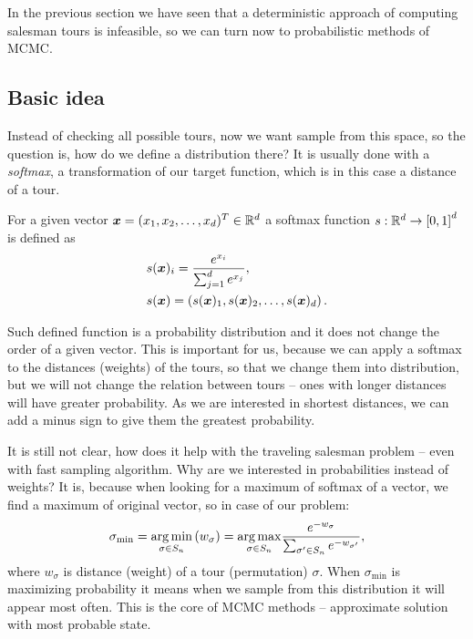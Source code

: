 In the previous section we have seen that a deterministic approach of computing salesman tours is infeasible, so we can turn now to probabilistic methods of MCMC. 

\subsection{Basic idea}
	Instead of checking all possible tours, now we want sample from this space, so the question is, how do we define a distribution there? It is usually done with a \textit{softmax}, a transformation of our target function, which is in this case a distance of a tour.
	\begin{definition}
		For a given vector $\bm{x} = (x_1, x_2, \ldots, x_d)^T \in \mathbb{R}^d$ a softmax function $s: \mathbb{R}^d \rightarrow \left[0, 1\right]^d$ is defined as
		\begin{align*}
			&s(\bm{x})_i = \frac{e^{x_i}}{\sum_{j=1}^{d} e^{x_j}}, \\
			&s(\bm{x}) = \left( s(\bm{x})_1, s(\bm{x})_2, \ldots, s(\bm{x})_d \right).
		\end{align*}
	\end{definition}
	Such defined function is a probability distribution and it does not change the order of a given vector. This is important for us, because we can apply a softmax to the distances (weights) of the tours, so that we change them into distribution, but we will not change the relation between tours -- ones with longer distances will have greater probability. As we are interested in shortest distances, we can add a minus sign to give them the greatest probability.
	
	It is still not clear, how does it help with the traveling salesman problem -- even with fast sampling algorithm. Why are we interested in probabilities instead of weights? It is, because when looking for a maximum of softmax of a vector, we find a maximum of original vector, so in case of our problem:
	\begin{equation*}
		\sigma_{\min} = \underset{\sigma \in S_n}{\operatorname*{arg\,min}} \left( w_{\sigma} \right) = \underset{\sigma \in S_n}{\operatorname*{arg\,max}} \frac{e^{-w_{\sigma}}}{\sum_{\sigma' \in S_n} e^{-w_{\sigma'}}},
	\end{equation*}
	where $w_{\sigma}$ is distance (weight) of a tour (permutation) $\sigma$. When $\sigma_{\min}$ is maximizing probability it means when we sample from this distribution it will appear most often. This is the core of MCMC methods -- approximate solution with most probable state. 

